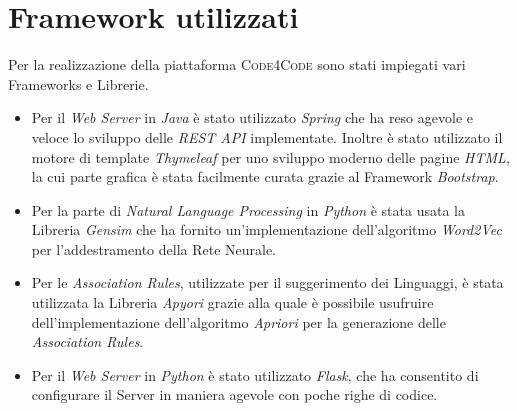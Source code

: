 \section{Framework utilizzati}
Per la realizzazione della piattaforma \textsc{Code4Code} sono stati impiegati vari Frameworks e Librerie. 
\begin{itemize}
    \item Per il \emph{Web Server} in \emph{Java} è stato utilizzato \emph{Spring} che ha reso agevole e veloce lo sviluppo delle \emph{REST API} implementate. Inoltre è stato utilizzato il motore di template \emph{Thymeleaf} per uno sviluppo moderno delle pagine \emph{HTML}, la cui parte grafica è stata facilmente curata grazie al Framework \emph{Bootstrap}.
    \item Per la parte di \emph{Natural Language Processing} in \emph{Python} è stata usata la Libreria \emph{Gensim} che ha fornito un'implementazione dell'algoritmo \emph{Word2Vec} per l'addestramento della Rete Neurale.
    \item Per le \emph{Association Rules}, utilizzate per il suggerimento dei Linguaggi, è stata utilizzata la Libreria \emph{Apyori} grazie alla quale è possibile usufruire dell'implementazione dell'algoritmo \emph{Apriori} per la generazione delle \emph{Association Rules}.
    \item Per il \emph{Web Server} in \emph{Python} è stato utilizzato \emph{Flask}, che ha consentito di configurare il Server in maniera agevole con poche righe di codice.   
\end{itemize}
\newpage
